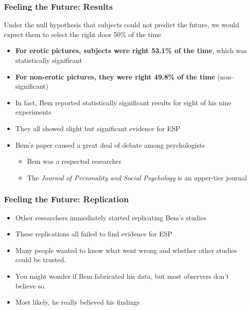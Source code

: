 \documentclass[10pt, block=fill]{beamer}
\begin{document}
\begin{frame}
  \frametitle{Feeling the Future: Results}

  Under the null hypothesis that subjects could not predict the future, we would expect them to select the right door 50\% of the time  
  \begin{itemize}
    \item \textbf{For erotic pictures, subjects were right 53.1\% of the time}, which was statistically significant
    \item \textbf{For non-erotic pictures, they were right 49.8\% of the time} (non-significant)
    \item In fact, Bem reported statistically significant results for eight of his nine experiments 
    \item They all showed slight but significant evidence for ESP
    \item Bem's paper caused a great deal of debate among psychologists
    \begin{itemize}
      \item Bem was a respected researcher
      \item The \textit{Journal of Personality and Social Psychology} is an upper-tier journal
    \end{itemize}
  \end{itemize}
    
\end{frame}


\begin{frame}
  \frametitle{Feeling the Future: Replication}
  
  \begin{itemize}
    \item Other researchers immediately started replicating Bem's studies
    \item These replications all failed to find evidence for ESP
    \item Many people wanted to know what went wrong and whether other studies could be trusted.
    \item You might wonder if Bem fabricated his data, but most observers don't believe so.
    \item Most likely, he really believed his findings

  \end{itemize}
    
\end{frame}
\end{document}
